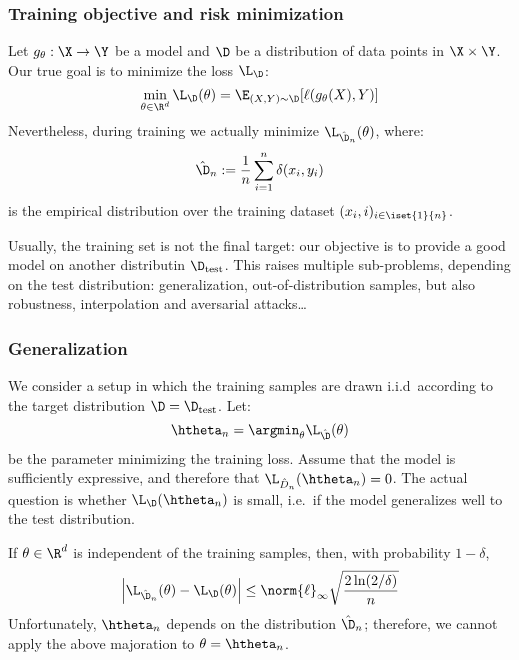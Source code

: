 \subsubsection{Training objective and risk minimization}
Let $g_\theta:\X\to\Y$ be a model and $\D$ be a distribution of data points in $\X\times\Y$. Our true goal is to minimize the loss $\L_\D$:
\begin{equation*}
    \min_{\theta\in\R^d}\L_\D(\theta) = \E_{(X,Y)\sim\D}[\ell(g_\theta(X),Y)]
\end{equation*}
Nevertheless, during training we actually minimize $\L_{\hat{\D}_n}(\theta)$, where:
\begin{equation*}
    \hat{\D}_n := \frac{1}{n}\sum_{i=1}^n\delta(x_i, y_i)
\end{equation*}
is the empirical distribution over the training dataset $(x_i,i)_{i\in\iset{1}{n}}$.

Usually, the training set is not the final target: our objective is to provide a good model on another distributin $\D_{\textnormal{test}}$. This raises multiple sub-problems, depending on the test distribution: generalization, out-of-distribution samples, but also robustness, interpolation and aversarial attacks\dots

\subsubsection{Generalization}
We consider a setup in which the training samples are drawn i.i.d~according to the target distribution $\D=\D_{\textnormal{test}}$. Let:
\begin{equation*}
    \htheta_n = \argmin_\theta\L_{\hat{\D}}(\theta)
\end{equation*}
be the parameter minimizing the training loss. Assume that the model is sufficiently expressive, and therefore that $\L_{\hat{D}_n}(\htheta_n)=0$. The actual question is whether $\L_{\D}(\htheta_n)$ is small, i.e.~if the model generalizes well to the test distribution.

If $\theta\in\R^d$ is independent of the training samples, then, with probability $1-\delta$,
\begin{equation*}
    \left|\L_{\hat{\D}_n}(\theta)-\L_{\D}(\theta)\right| \leq \norm{\ell}_\infty \sqrt{\frac{2\ln(2/\delta)}{n}}
\end{equation*}
Unfortunately, $\htheta_n$ depends on the distribution $\hat{\D}_n$; therefore, we cannot apply the above majoration to $\theta=\htheta_n$.

